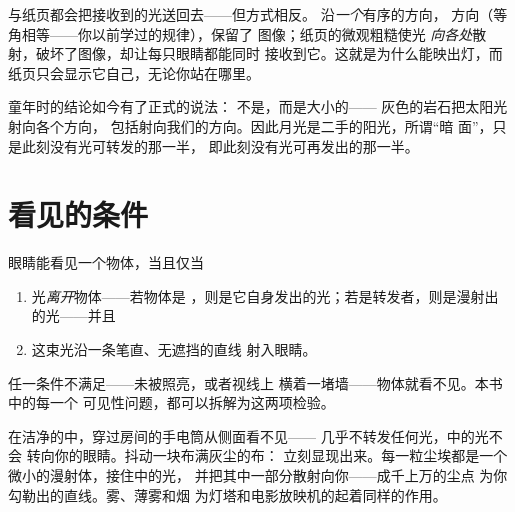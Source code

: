 \begin{example}[漫射不是镜面反射]\label{ex:g7:light-sources-propagation:notmirror}
与纸页都会把接收到的光送回去——但方式相反。
沿\emph{一个}有序的方向，
方向（等角相等——你以前学过的规律），保留了
图像；纸页的微观粗糙使光
\emph{向各处}散射，破坏了图像，却让每只眼睛都能同时
接收到它。这就是为什么能映出灯，而
纸页只会显示它自己，无论你站在哪里。
\end{example}

\begin{example}[月球的案子已结]\label{ex:g7:light-sources-propagation:moon}
童年时的结论如今有了正式的说法：
不是，而是大小的——
灰色的岩石把太阳光射向各个方向，
包括射向我们的方向。因此月光是二手的阳光，所谓“暗
面”，只是此刻没有光可转发的那一半，
即此刻没有光可再发出的那一半。
\end{example}

\section{看见的条件}

\begin{proposition}[视觉的两个条件]\label{prop:g7:light-sources-propagation:vision}
眼睛能看见一个物体，当且仅当
\begin{enumerate}
  \item 光\emph{离开}物体——若物体是
        ，则是它自身发出的光；若是转发者，则是漫射出的光——并且
  \item 这束光沿一条笔直、无遮挡的直线
        射入眼睛。
\end{enumerate}
任一条件不满足——未被照亮，或者视线上
横着一堵墙——物体就看不见。本书中的每一个
可见性问题，都可以拆解为这两项检验。
\end{proposition}

\begin{example}[被看见的光束]\label{ex:g7:light-sources-propagation:beam}
在洁净的中，穿过房间的手电筒从侧面看不见——
几乎不转发任何光，中的光不会
转向你的眼睛。抖动一块布满灰尘的布：
立刻显现出来。每一粒尘埃都是一个微小的漫射体，接住中的光，
并把其中一部分散射向你——成千上万的尘点
为你勾勒出的直线。雾、薄雾和烟
为灯塔和电影放映机的起着同样的作用。
\end{example}

